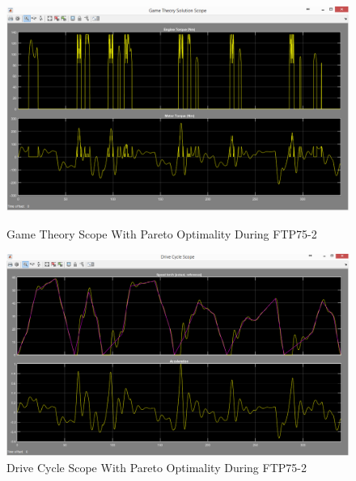 \begin{figure}[hp]
\centering
\includegraphics[scale=0.475]{figures/Pareto/FTP75-2/gameTheory03Juli}
\caption{Game Theory Scope With Pareto Optimality During FTP75-2}
\label{fig:gtpo2}
\includegraphics[scale=0.45]{figures/Pareto/FTP75-2/driveCycle03Juli}
\caption{Drive Cycle Scope With Pareto Optimality During FTP75-2}
\label{fig:dcpo2}
\end{figure}


